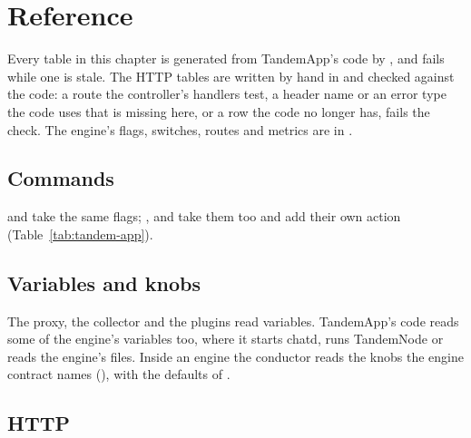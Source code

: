 \chapter{Reference}\label{ch:ref-app}

Every table in this chapter is generated from TandemApp's code by , and  fails while one is stale. The HTTP tables are written by hand in  and checked against the code: a route the controller's handlers test, a header name or an error type the code uses that is missing here, or a row the code no longer has, fails the check. The engine's flags, switches, routes and metrics are in .

\section{Commands}

 and  take the same flags; ,  and  take them too and add their own action (Table~\ref{tab:tandem-app}).







\section{Variables and knobs}

The proxy, the collector and the plugins read  variables. TandemApp's code reads some of the engine's  variables too, where it starts chatd, runs TandemNode or reads the engine's files. Inside an engine the conductor reads the  knobs the engine contract names (), with the defaults of .







\section{HTTP}

